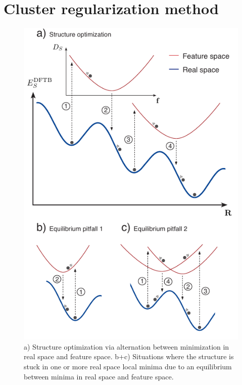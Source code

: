 \documentclass[aip,amsmath,amssymb,reprint]{revtex4-1}
\begin{document}
\section{Cluster regularization method}

\begin{figure}[tb]
    \centering
    \includegraphics[width=1.0\columnwidth]{fig5-schematic.pdf}
    \caption{a) Structure optimization via alternation between minimization in real space and feature space. b+c) Situations where the structure is stuck in one or more real space local minima due to an equilibrium between minima in real space and feature space.}
    \label{fig_schem}
\end{figure}
\end{document}
